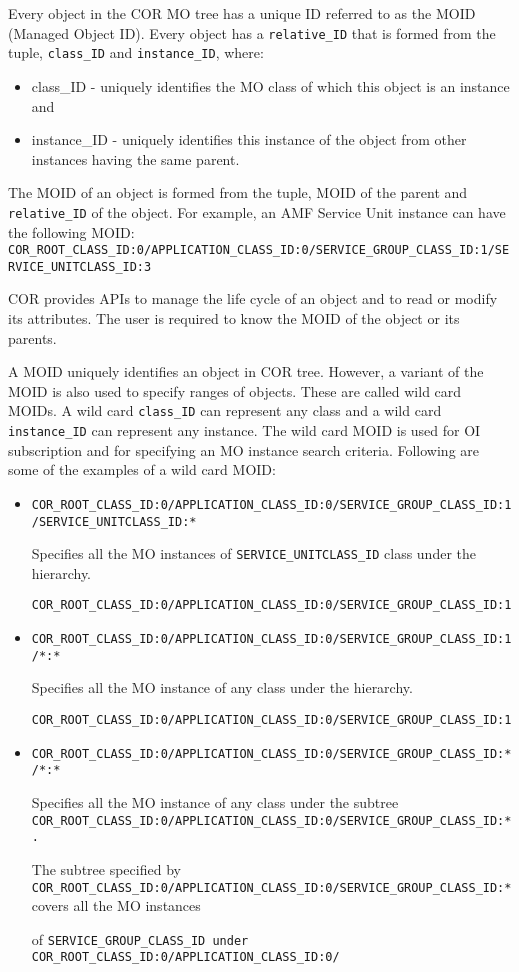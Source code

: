 \begin{flushleft}
Every object in the COR MO tree has a unique ID referred to as the MOID (Managed Object ID).
Every object has a {\tt{relative\_\-ID}} that is formed from the tuple, {\tt{class\_\-ID}} and {\tt{instance\_\-ID}}, where:
\begin{itemize}
\item
class\_\-ID - uniquely identifies the MO class of which this object is an instance and 
\item
instance\_\-ID - uniquely identifies this instance of the object from other instances having the same parent.
\end{itemize}
The MOID of an object is formed from the tuple, MOID of the parent and {\tt{relative\_\-ID}} of the object.
For example, an AMF Service Unit instance can have the following MOID: 
{\tt{COR\_\-ROOT\_\-CLASS\_\-ID:0/APPLICATION\_\-CLASS\_\-ID:0/SERVICE\_\-GROUP\_\-CLASS\_\-ID:1/SERVICE\_\-UNITCLASS\_\-ID:3}}
\par
COR provides APIs to manage the life cycle of an object and to read or modify its attributes. The user is required to know the MOID of the 
object or its parents.
\par
A MOID uniquely identifies an object in COR tree. However, a variant of the MOID is also used to specify ranges of objects. These are called wild card 
MOIDs. A wild card {\tt{class\_\-ID}} can represent any class and a wild card {\tt{instance\_\-ID}} can represent any instance. The wild card MOID 
is used for OI subscription and for specifying an MO instance search criteria. Following are some of the examples of a wild card MOID:
\begin{itemize}
\item
{\tt{COR\_\-ROOT\_\-CLASS\_\-ID:0/APPLICATION\_\-CLASS\_\-ID:0/SERVICE\_\-GROUP\_\-CLASS\_\-ID:1/SERVICE\_\-UNITCLASS\_\-ID:*}}\par
Specifies all the MO instances of {\tt{SERVICE\_\-UNITCLASS\_\-ID}} class under the hierarchy. \par
{\tt{COR\_\-ROOT\_\-CLASS\_\-ID:0/APPLICATION\_\-CLASS\_\-ID:0/SERVICE\_\-GROUP\_\-CLASS\_\-ID:1}}
\item
{\tt{COR\_\-ROOT\_\-CLASS\_\-ID:0/APPLICATION\_\-CLASS\_\-ID:0/SERVICE\_\-GROUP\_\-CLASS\_\-ID:1/*:*}}\par
Specifies all the MO instance of any class under the hierarchy.\par
{\tt{COR\_\-ROOT\_\-CLASS\_\-ID:0/APPLICATION\_\-CLASS\_\-ID:0/SERVICE\_\-GROUP\_\-CLASS\_\-ID:1}}
\item
{\tt{COR\_\-ROOT\_\-CLASS\_\-ID:0/APPLICATION\_\-CLASS\_\-ID:0/SERVICE\_\-GROUP\_\-CLASS\_\-ID:*/*:*}}\par
Specifies all the MO instance of any class under the subtree {\tt{COR\_\-ROOT\_\-CLASS\_\-ID:0/APPLICATION\_\-CLASS\_\-ID:0/SERVICE\_\-GROUP\_\-CLASS\_\-ID:*.}}\par
The subtree specified by {\tt{COR\_\-ROOT\_\-CLASS\_\-ID:0/APPLICATION\_\-CLASS\_\-ID:0/SERVICE\_\-GROUP\_\-CLASS\_\-ID:*}} covers all the MO instances\par
of {\tt{SERVICE\_\-GROUP\_\-CLASS\_\-ID under COR\_\-ROOT\_\-CLASS\_\-ID:0/APPLICATION\_\-CLASS\_\-ID:0/}}
\end{itemize}



\end{flushleft}
